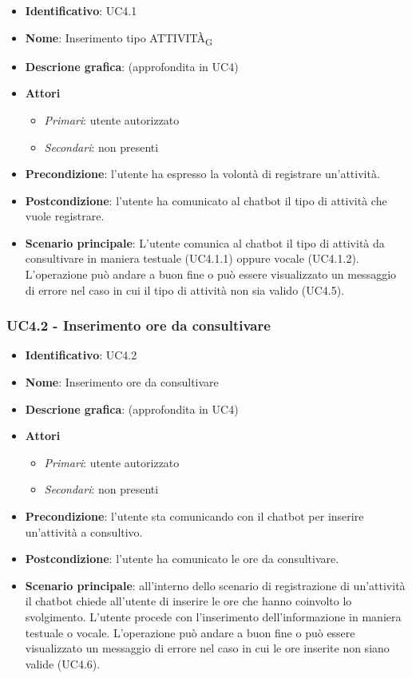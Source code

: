 \begin{itemize}
    \item \textbf{Identificativo}: UC4.1 
    \item \textbf{Nome}: Inserimento tipo ATTIVITÀ\textsubscript{G} 
    \item \textbf{Descrione grafica}: (approfondita in UC4)
    \item \textbf{Attori}
        \begin{itemize} 
            \item \textit{Primari}: utente autorizzato
            \item \textit{Secondari}: non presenti
        \end{itemize}
    \item \textbf{Precondizione}: l'utente ha espresso la volontà di registrare un'attività. 
    \item \textbf{Postcondizione}: l'utente ha comunicato al chatbot il tipo di attività che vuole registrare. 
    \item \textbf{Scenario principale}: L'utente comunica al chatbot il tipo di attività da consultivare in maniera testuale (UC4.1.1) oppure vocale (UC4.1.2). L'operazione può andare a buon fine o può essere visualizzato un messaggio di errore nel caso in cui il tipo di attività non sia valido (UC4.5).
\end{itemize}

\subsubsection{UC4.2 - Inserimento ore da consultivare}
\begin{itemize}
    \item \textbf{Identificativo}: UC4.2 
    \item \textbf{Nome}: Inserimento ore da consultivare  
    \item \textbf{Descrione grafica}: (approfondita in UC4)
    \item \textbf{Attori}
        \begin{itemize} 
            \item \textit{Primari}: utente autorizzato
            \item \textit{Secondari}: non presenti
        \end{itemize}
    \item \textbf{Precondizione}: l'utente sta comunicando con il chatbot per inserire un'attività a consultivo. 
    \item \textbf{Postcondizione}: l'utente ha comunicato le ore da consultivare. 
    \item \textbf{Scenario principale}: all'interno dello scenario di registrazione di un'attività il chatbot chiede all'utente di inserire le ore che hanno coinvolto lo svolgimento. L'utente procede con l'inserimento dell'informazione in maniera testuale o vocale. L'operazione può andare a buon fine o può essere visualizzato un messaggio di errore nel caso in cui le ore inserite non siano valide (UC4.6).
\end{itemize}
\newpage

